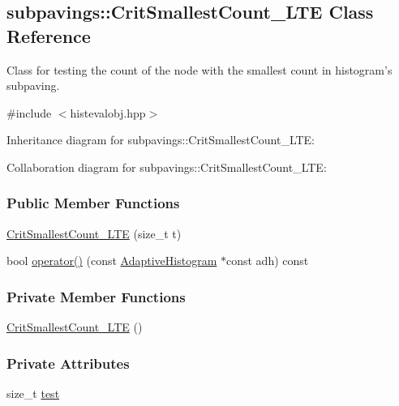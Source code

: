 \hypertarget{classsubpavings_1_1CritSmallestCount__LTE}{\subsection{subpavings\-:\-:\-Crit\-Smallest\-Count\-\_\-\-L\-T\-E \-Class \-Reference}
\label{classsubpavings_1_1CritSmallestCount__LTE}
}


\-Class for testing the count of the node with the smallest count in histogram's subpaving.  




{\ttfamily \#include $<$histevalobj.\-hpp$>$}



\-Inheritance diagram for subpavings\-:\-:\-Crit\-Smallest\-Count\-\_\-\-L\-T\-E\-:


\-Collaboration diagram for subpavings\-:\-:\-Crit\-Smallest\-Count\-\_\-\-L\-T\-E\-:
\subsubsection*{\-Public \-Member \-Functions}
\begin{DoxyCompactItemize}
\item 
\hyperlink{classsubpavings_1_1CritSmallestCount__LTE_af102e109a7275a2d0634deb072f79b38}{\-Crit\-Smallest\-Count\-\_\-\-L\-T\-E} (size\-\_\-t t)
\item 
bool \hyperlink{classsubpavings_1_1CritSmallestCount__LTE_a827ca361ea6386926931f7bb3f618797}{operator()} (const \hyperlink{classsubpavings_1_1AdaptiveHistogram}{\-Adaptive\-Histogram} $\ast$const adh) const 
\end{DoxyCompactItemize}
\subsubsection*{\-Private \-Member \-Functions}
\begin{DoxyCompactItemize}
\item 
\hyperlink{classsubpavings_1_1CritSmallestCount__LTE_aa67c8d9c4f663a65148c9b59e0e469ec}{\-Crit\-Smallest\-Count\-\_\-\-L\-T\-E} ()
\end{DoxyCompactItemize}
\subsubsection*{\-Private \-Attributes}
\begin{DoxyCompactItemize}
\item 
size\-\_\-t \hyperlink{classsubpavings_1_1CritSmallestCount__LTE_a0fdd010902559f018f7af32955d1278e}{test}
\end{DoxyCompactItemize}


